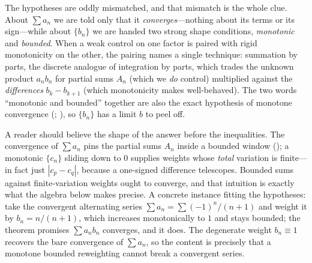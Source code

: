 \documentclass[main.tex]{subfiles}
\begin{document}
\begin{Reflection}
The hypotheses are oddly mismatched, and that mismatch is the whole clue. About $\sum a_{n}$ we are
told only that it \emph{converges}---nothing about its terms or its sign---while about $\{b_{n}\}$ we
are handed two strong shape conditions, \emph{monotonic} and \emph{bounded}. When a weak control on
one factor is paired with rigid monotonicity on the other, the pairing names a single technique:
summation by parts, the discrete analogue of integration by parts, which trades the unknown product
$a_{n}b_{n}$ for partial sums $A_{n}$ (which we \emph{do} control) multiplied against the
\emph{differences} $b_{k}-b_{k+1}$ (which monotonicity makes well-behaved). The two words
``monotonic and bounded'' together are also the exact hypothesis of monotone convergence
(; ), so $\{b_{n}\}$ has
a limit $b$ to peel off.

A reader should believe the shape of the answer before the inequalities. The convergence of
$\sum a_{n}$ pins the partial sums $A_{n}$ inside a bounded window (); a monotonic $\{c_{n}\}$ sliding down to $0$ supplies weights whose
\emph{total} variation is finite---in fact just $|c_{p}-c_{q}|$, because a one-signed difference
telescopes. Bounded sums against finite-variation weights ought to converge, and that intuition is
exactly what the algebra below makes precise. A concrete instance fitting the hypotheses: take the
convergent alternating series $\sum a_{n}=\sum(-1)^{n}/(n+1)$ and weight it by $b_{n}=n/(n+1)$, which
increases monotonically to $1$ and stays bounded; the theorem promises $\sum a_{n}b_{n}$ converges,
and it does. The degenerate weight $b_{n}\equiv 1$ recovers the bare convergence of $\sum a_{n}$, so
the content is precisely that a monotone bounded reweighting cannot break a convergent series.


\end{Reflection}
\end{document}
